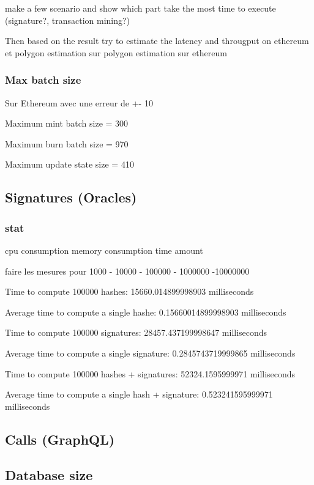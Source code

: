\documentclass[a4paper,11pt,oneside]{report}
\begin{document}
make a few scenario and show which part take the most time to execute (signature?, transaction mining?)


Then based on the result try to estimate the latency and througput on ethereum et polygon
estimation sur polygon
estimation sur ethereum

\subsubsection{Max batch size}
Sur Ethereum avec une erreur de +- 10 

Maximum mint batch size = 300 

Maximum burn batch size = 970

Maximum update state size = 410

\subsection{Signatures (Oracles)}

\subsubsection{stat}
cpu consumption
memory consumption
time amount



faire les mesures pour 1000 - 10000 - 100000 - 1000000 -10000000



Time to compute 100000 hashes: 15660.014899998903 milliseconds

Average time to compute a single hashe: 0.15660014899998903 milliseconds

Time to compute 100000 signatures: 28457.437199998647 milliseconds

Average time to compute a single signature: 0.2845743719999865 milliseconds

Time to compute 100000 hashes + signatures: 52324.1595999971 milliseconds

Average time to compute a single hash + signature: 0.523241595999971 milliseconds

\subsection{Calls (GraphQL)}

\subsection{Database size}
\end{document}
